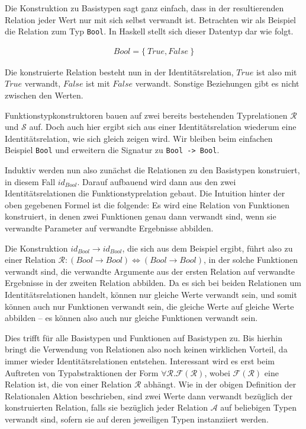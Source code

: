 
Die Konstruktion zu Basistypen sagt ganz einfach, dass in der resultierenden Relation jeder Wert nur mit sich selbst verwandt ist.
Betrachten wir als Beispiel die Relation zum Typ \texttt{Bool}. In Haskell stellt sich dieser Datentyp dar wie folgt.

\begin{align*}
Bool = \{~True, False~\}
\end{align*}

Die konstruierte Relation besteht nun in der Identitätsrelation, $True$ ist also mit $True$ verwandt, $False$ ist mit $False$ verwandt.
Sonstige Beziehungen gibt es nicht zwischen den Werten.

Funktionstypkonstruktoren bauen auf zwei bereits bestehenden Typrelationen $\mathcal{R}$ und $\mathcal{S}$ auf. Doch auch
hier ergibt sich aus einer Identitätsrelation wiederum eine Identitätsrelation, wie sich gleich zeigen wird. Wir bleiben beim einfachen
Beispiel \texttt{Bool} und erweitern die Signatur zu \texttt{Bool -> Bool}.

Induktiv werden nun also zunächst die Relationen zu den Basistypen konstruiert, in diesem Fall $id_{Bool}$. Darauf aufbauend
wird dann aus den zwei Identitätsrelationen die Funktionstyprelation gebaut. Die Intuition hinter der oben gegebenen Formel ist
die folgende: Es wird eine Relation von Funktionen konstruiert, in denen zwei Funktionen genau dann verwandt sind, wenn sie
verwandte Parameter auf verwandte Ergebnisse abbilden.

Die Konstruktion $id_{Bool} \rightarrow id_{Bool}$, die sich aus dem Beispiel ergibt, führt also zu einer Relation
$\mathcal{R} : (Bool \rightarrow Bool) \Leftrightarrow (Bool \rightarrow Bool)$, in der solche Funktionen verwandt sind,
die verwandte Argumente aus der ersten Relation auf verwandte Ergebnisse in der zweiten Relation abbilden. Da es sich bei
beiden Relationen um Identitätsrelationen handelt, können nur gleiche Werte verwandt sein, und somit können auch nur
Funktionen verwandt sein, die gleiche Werte auf gleiche Werte abbilden -- es können also auch nur gleiche Funktionen verwandt
sein.

Dies trifft für alle Basistypen und Funktionen auf Basistypen zu. Bis hierhin bringt die Verwendung von Relationen also noch keinen
wirklichen Vorteil, da immer wieder Identitätsrelationen entstehen. Interessant wird es erst beim Auftreten von Typabstraktionen der
Form
$\forall \mathcal{R} . \mathcal{F}(\mathcal{R})$, wobei $\mathcal{F}(\mathcal{R})$ eine Relation ist, die von einer Relation
$\mathcal{R}$ abhängt. Wie in der obigen Definition der Relationalen Aktion beschrieben, sind zwei Werte dann verwandt bezüglich der
konstruierten Relation, falls sie bezüglich jeder Relation $\mathcal{A}$ auf beliebigen Typen verwandt sind, sofern sie auf deren
jeweiligen Typen instanziiert werden. 

